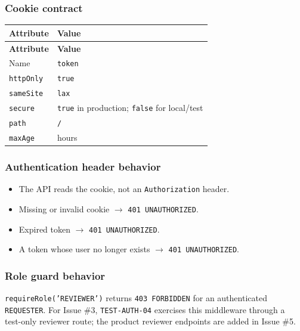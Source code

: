 \documentclass[11pt,a4paper]{article}
\begin{document}
\subsubsection{Cookie contract}

\vspace{0.3em}
\begin{longtable}{|>{\RaggedRight}p{4.5cm}|>{\RaggedRight}p{11.3cm}|}
\hline
\rowcolor{zenPale}\textbf{Attribute} & \textbf{Value} \\ \hline
\endfirsthead
\hline
\rowcolor{zenPale}\textbf{Attribute} & \textbf{Value} \\ \hline
\endhead
\hline
\endfoot
Name & \texttt{token} \\ \hline
\texttt{httpOnly} & \texttt{true} \\ \hline
\texttt{sameSite} & \texttt{lax} \\ \hline
\texttt{secure} & \texttt{true} in production; \texttt{false} for local/test \\ \hline
\texttt{path} & \texttt{/\allowbreak } \\ \hline
\texttt{maxAge} & 8 hours \\ \hline
\end{longtable}
\vspace{0.3em}

\subsubsection{Authentication header behavior}

\begin{itemize}[leftmargin=*,itemsep=2pt,topsep=2pt]
  \item The API reads the cookie, not an \texttt{Authorization} header.
  \item Missing or invalid cookie $\rightarrow$ \texttt{401 UNAUTHORIZED}.
  \item Expired token $\rightarrow$ \texttt{401 UNAUTHORIZED}.
  \item A token whose user no longer exists $\rightarrow$ \texttt{401 UNAUTHORIZED}.
\end{itemize}
\subsubsection{Role guard behavior}

\texttt{requireRole('REVIEWER')} returns \texttt{403 FORBIDDEN} for an authenticated\\
\texttt{REQUESTER}. For Issue \#3, \texttt{TEST-AUTH-04} exercises this middleware through a\\
test-only reviewer route; the product reviewer endpoints are added in Issue \#5.\\
\end{document}
